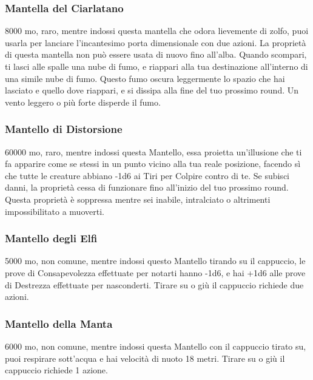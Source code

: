 \begin{multicols}{2}
\subsubsection*{Mantella del Ciarlatano}
8000 mo, raro, mentre indossi questa mantella che odora lievemente di zolfo, puoi usarla per lanciare l'incantesimo porta dimensionale con due azioni. La proprietà di questa mantella non può essere usata di nuovo fino all'alba. Quando scompari, ti lasci alle spalle una nube di fumo, e riappari alla tua destinazione all'interno di una simile nube di fumo. Questo fumo oscura leggermente lo spazio che hai lasciato e quello dove riappari, e si dissipa alla fine del tuo prossimo round. Un vento leggero o più forte disperde il fumo.

\subsubsection*{Mantello di Distorsione}
60000 mo, raro, mentre indossi questa Mantello, essa proietta un'illusione che ti fa apparire come se stessi in un punto vicino alla tua reale posizione, facendo sì che tutte le creature abbiano -1d6 ai Tiri per Colpire contro di te. Se subisci danni, la proprietà cessa di funzionare fino all'inizio del tuo prossimo round. Questa proprietà è soppressa mentre sei inabile, intralciato o altrimenti impossibilitato a muoverti.

\subsubsection*{Mantello degli Elfi}
5000 mo, non comune, mentre indossi questo Mantello tirando su il cappuccio, le prove di Consapevolezza effettuate per notarti hanno -1d6, e hai +1d6 alle prove di Destrezza effettuate per nasconderti. Tirare su o giù il cappuccio richiede due azioni.

\subsubsection*{Mantello della Manta}
6000 mo, non comune, mentre indossi questa Mantello con il cappuccio tirato su, puoi respirare sott'acqua e hai velocità di nuoto 18 metri. Tirare su o giù il cappuccio richiede 1 azione.


\end{multicols}
